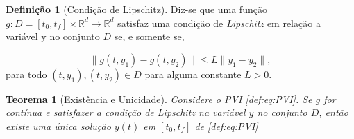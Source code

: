 \documentclass{beamer}
\newcommand{\R}{\mathbb{R}}
\theoremstyle{plain}
\newtheorem{teo}{Teorema}
\theoremstyle{definition}
\newtheorem{defi}{Definição}
\begin{document}
\begin{frame}

    \begin{defi}[Condição de Lipschitz]
        \label{def:2:condicao_de_lispchitz}
        Diz-se que uma função $g: D = [t_0, t_f] \times \R^d \to \R^d$ satisfaz uma condição de \textit{Lipschitz} em relação a variável y no conjunto $D$ se, e somente se,

        \begin{equation}
            \| g(t, y_1) - g(t, y_2) \| \leq L \| y_1 - y_2 \|, 
            \label{def:IVP_Lips}
        \end{equation}
        para todo $(t, y_1), (t, y_2) \in D$ para alguma constante $L>0$.
    \end{defi}


    \begin{teo}[Existência e Unicidade]
        
    \label{teo:1:PVI:existencia_unicidade}
    Considere o PVI \eqref{def:eq:PVI}. Se $g$ for contínua e satisfazer a condição de Lipschitz na variável $y$ no conjunto $D$, então existe uma única solução $y(t)$ em $[t_0, t_f]$ de \eqref{def:eq:PVI} 
    \end{teo}


\end{frame}
\end{document}
